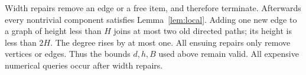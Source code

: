 Width repairs remove an edge or a free item, and therefore terminate.
Afterwards every nontrivial component satisfies Lemma~\ref{lem:local}.
Adding one new edge to a graph of height less than $H$ joins at most two
old directed paths; its height is less than $2H$. The degree rises by at
most one. All ensuing repairs only remove vertices or edges. Thus the
bounds $d,h,B$ used above remain valid.
All expensive numerical queries occur after width repairs.
